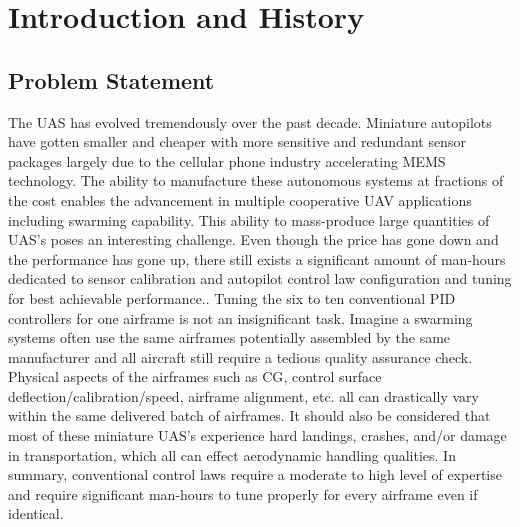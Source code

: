 \chapter{Introduction and History}\label{ch:intro}


\section{Problem Statement}
The \ac{UAS} has evolved tremendously over the past decade.  Miniature autopilots have gotten smaller and cheaper with more sensitive and redundant sensor packages largely due to the cellular phone industry accelerating \ac{MEMS} technology.  The ability to manufacture these autonomous systems at fractions of the cost enables the advancement in multiple cooperative UAV applications including swarming capability.  This ability to mass-produce large quantities of \ac{UAS}'s poses an interesting challenge.  Even though the price has gone down and the performance has gone up, there still exists a significant amount of man-hours dedicated to sensor calibration and autopilot control law configuration and tuning for best achievable performance..  Tuning the six to ten conventional \ac{PID} controllers for one airframe is not an insignificant task.  Imagine a swarming systems often use the same airframes potentially assembled by the same manufacturer and all aircraft still require a tedious quality assurance check.  Physical aspects of the airframes such as \ac{CG}, control surface deflection/calibration/speed, airframe alignment, etc. all can drastically vary within the same delivered batch of airframes.  It should also be considered that most of these miniature \ac{UAS}'s experience hard landings, crashes, and/or damage in transportation, which all can effect aerodynamic handling qualities.  In summary, conventional control laws require a moderate to high level of expertise and require significant man-hours to tune properly for every airframe even if identical.  

